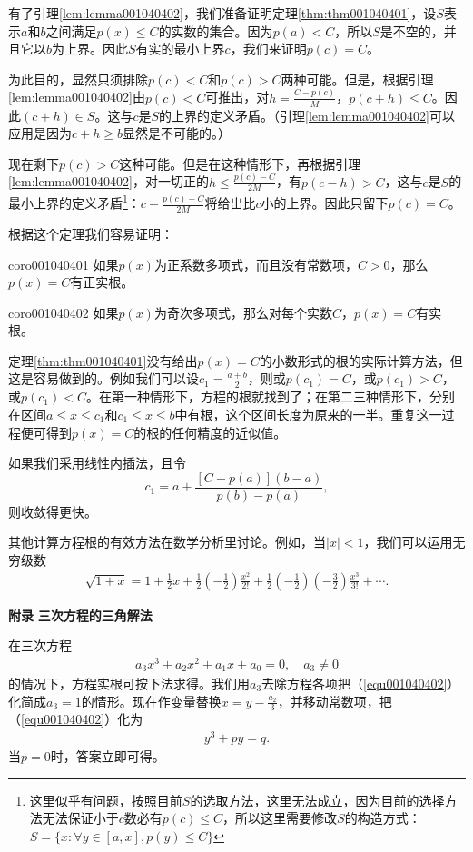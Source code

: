 有了引理\ref{lem:lemma001040402}，我们准备证明定理\ref{thm:thm001040401}，设$S$表示$a$和$b$之间满足$p(x) \le C$的实数的集合。因为$p(a) < C$，所以$S$是不空的，并且它以$b$为上界。因此$S$有实的最小上界$c$，我们来证明$p(c)=C$。

为此目的，显然只须排除$p(c)<C$和$p(c)>C$两种可能。但是，根据引理\ref{lem:lemma001040402}由$p(c)<C$可推出，对$h=\frac{C-p(c)}{M}$，$p(c+h) \le C$。因此$(c+h) \in S$。这与$c$是$S$的上界的定义矛盾。（引理\ref{lem:lemma001040402}可以应用是因为$c+h \ge b$显然是不可能的。）

现在剩下$p(c)>C$这种可能。但是在这种情形下，再根据引理\ref{lem:lemma001040402}，对一切正的$h \le \frac{p(c)-C}{2M}$，有$p(c-h)>C$，这与$c$是$S$的最小上界的定义矛盾\footnote{这里似乎有问题，按照目前$S$的选取方法，这里无法成立，因为目前的选择方法无法保证小于$c$数必有$p(c)\le C$，所以这里需要修改$S$的构造方式：$S=\{x:\forall y \in [a, x], p(y) \le C\}$}：$c - \frac{p(c)-C}{2M}$将给出比$c$小的上界。因此只留下$p(c)=C$。

根据这个定理我们容易证明：
\begin{corollary}{}{coro001040401}
如果$p(x)$为正系数多项式，而且没有常数项，$C > 0$，那么$p(x)=C$有正实根。
\end{corollary}

\begin{corollary}{}{coro001040402}
如果$p(x)$为奇次多项式，那么对每个实数$C$，$p(x)=C$有实根。
\end{corollary}

定理\ref{thm:thm001040401}没有给出$p(x)=C$的小数形式的根的实际计算方法，但这是容易做到的。例如我们可以设$c_1 = \frac{a+b}{2}$，则或$p(c_1) = C$，或$p(c_1) > C$，或$p(c_1) < C$。在第一种情形下，方程的根就找到了；在第二三种情形下，分别在区间$a \le x \le c_1$和$c_1 \le x \le b$中有根，这个区间长度为原来的一半。重复这一过程便可得到$p(x)=C$的根的任何精度的近似值。

如果我们采用线性内插法，且令
\[
c_1 = a + \frac{[C-p(a)](b-a)}{p(b)-p(a)},
\]
则收敛得更快。

其他计算方程根的有效方法在数学分析里讨论。例如，当$|x|<1$，我们可以运用无穷级数
\begin{gather}\label{equ001040401}
\sqrt{1+x} = 1 + \frac{1}{2}x + \frac{1}{2}(-\frac{1}{2})\frac{x^2}{2!}+\frac{1}{2}(-\frac{1}{2})(-\frac{3}{2})\frac{x^3}{3!}+\cdots.
\end{gather}

\textbf{附录} \quad \textbf{三次方程的三角解法}

在三次方程
\begin{gather}\label{equ001040402}
a_3x^3+a_2x^2+a_1x+a_0=0,\quad a_3 \neq 0
\end{gather}
的情况下，方程实根可按下法求得。我们用$a_3$去除方程各项把（\ref{equ001040402}）化简成$a_3=1$的情形。现在作变量替换$x=y-\frac{a_2}{3}$，并移动常数项，把（\ref{equ001040402}）化为
\begin{gather}\label{equ001040403}
y^3+py=q.
\end{gather}
当$p=0$时，答案立即可得。

